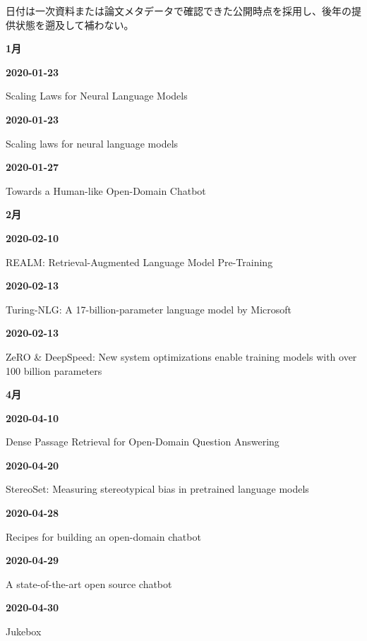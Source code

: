 \noindent 日付は一次資料または論文メタデータで確認できた公開時点を採用し、後年の提供状態を遡及して補わない。
\par\medskip
\medskip
\noindent\textbf{1月}\par
\smallskip
\noindent\textbf{2020-01-23}\par
{\raggedright Scaling Laws for Neural Language Models\par}
\smallskip
\noindent\textbf{2020-01-23}\par
{\raggedright Scaling laws for neural language models\par}
\smallskip
\noindent\textbf{2020-01-27}\par
{\raggedright Towards a Human-like Open-Domain Chatbot\par}
\smallskip
\medskip
\noindent\textbf{2月}\par
\smallskip
\noindent\textbf{2020-02-10}\par
{\raggedright REALM: Retrieval-Augmented Language Model Pre-Training\par}
\smallskip
\noindent\textbf{2020-02-13}\par
{\raggedright Turing-NLG: A 17-billion-parameter language model by Microsoft\par}
\smallskip
\noindent\textbf{2020-02-13}\par
{\raggedright ZeRO \& DeepSpeed: New system optimizations enable training models with over 100 billion parameters\par}
\smallskip
\medskip
\noindent\textbf{4月}\par
\smallskip
\noindent\textbf{2020-04-10}\par
{\raggedright Dense Passage Retrieval for Open-Domain Question Answering\par}
\smallskip
\noindent\textbf{2020-04-20}\par
{\raggedright StereoSet: Measuring stereotypical bias in pretrained language models\par}
\smallskip
\noindent\textbf{2020-04-28}\par
{\raggedright Recipes for building an open-domain chatbot\par}
\smallskip
\noindent\textbf{2020-04-29}\par
{\raggedright A state-of-the-art open source chatbot\par}
\smallskip
\noindent\textbf{2020-04-30}\par
{\raggedright Jukebox\par}
